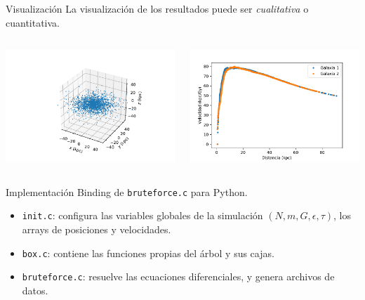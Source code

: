 \documentclass[handout]{beamer}
\begin{document}
\begin{frame}{Visualizaci\'on}
	La visualizaci\'on de los resultados puede ser \textit{cualitativa} o cuantitativa.
	\begin{columns}
		\begin{column}{0.5\textwidth}
			\includegraphics[height=0.35\textheight]{sources/images/galaxy_shape.pdf}
		\end{column}
		\begin{column}{0.5\textwidth}
			\includegraphics[height=0.35\textheight]{sources/images/rotation_curve.pdf}
		\end{column}
	\end{columns} 
\end{frame}
\begin{frame}{Implementaci\'on}
	Binding de \texttt{bruteforce.c} para Python.
	\begin{tcolorbox}[colback=green!5,colframe=green!40!black,title=C Programming Language]
		\begin{itemize}
			\item \texttt{init.c}: configura las variables globales de la simulaci\'on $(N, m, G, \epsilon, \tau)$, los arrays de posiciones y velocidades.
			\item \texttt{box.c}: contiene las funciones propias del \'arbol y sus cajas.
			\item \texttt{bruteforce.c}: resuelve las ecuaciones diferenciales, y genera archivos de datos.
		\end{itemize}
	\end{tcolorbox}
\end{frame}
\end{document}
